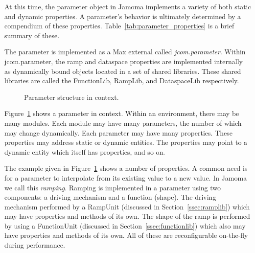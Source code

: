 \documentclass{article}
\begin{document}
At this time, the parameter object in Jamoma implements a variety of both static and dynamic properties. A parameter's behavior is ultimately determined by a compendium of these properties. %
Table~\ref{tab:parameter_properties} is a brief summary of these.


The parameter is implemented as a Max external called \emph{jcom.parameter}. Within jcom.parameter, the ramp and dataspace properties are implemented internally as dynamically bound objects located in a set of shared libraries.  These shared libraries are called the FunctionLib, RampLib, and DataspaceLib respectively.


\begin{figure}
\centerline{}
\caption{Parameter structure in context.}
\label{fig:structure}
\end{figure}


Figure~\ref{fig:structure} shows a parameter in context. Within an environment, there may be many modules. Each module may have many parameters, the number of which may change dynamically. Each parameter may have many properties. These properties may address static or dynamic entities. The properties may point to a dynamic entity which itself has properties, and so on.

The example given in Figure~\ref{fig:structure} shows a number of properties. A common need is for a parameter to interpolate from its existing value to a new value.  In Jamoma we call this \emph{ramping}. Ramping is implemented in a parameter using two components: a driving mechanism and a function (shape). The driving mechanism performed by a RampUnit (discussed in Section~\ref{ssec:ramplib}) which may have properties and methods of its own. The shape of the ramp is performed by using a FunctionUnit (discussed in Section~\ref{ssec:functionlib}) which also may have properties and methods of its own. All of these are reconfigurable on-the-fly during performance.
\end{document}
